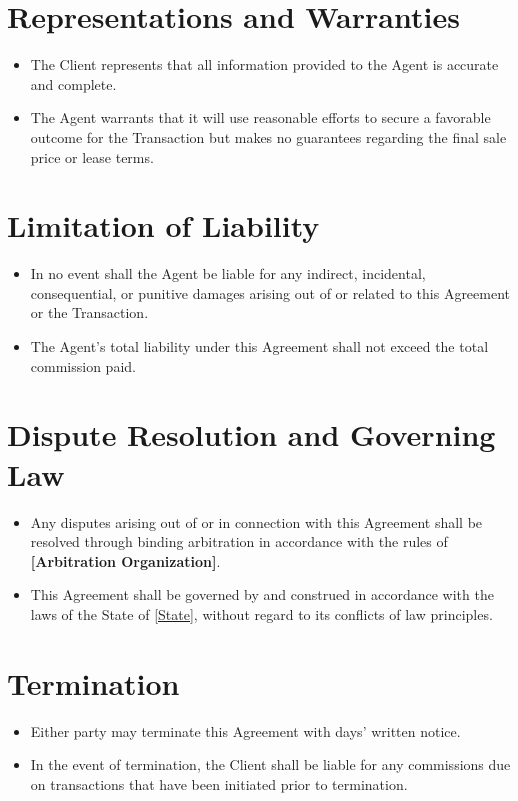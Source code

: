 \documentclass[12pt]{article}
\begin{document}
\section{Representations and Warranties}
\begin{itemize}[leftmargin=1.5cm]
    \item The Client represents that all information provided to the Agent is accurate and complete.
    \item The Agent warrants that it will use reasonable efforts to secure a favorable outcome for the Transaction but makes no guarantees regarding the final sale price or lease terms.
\end{itemize}

\section{Limitation of Liability}
\begin{itemize}[leftmargin=1.5cm]
    \item In no event shall the Agent be liable for any indirect, incidental, consequential, or punitive damages arising out of or related to this Agreement or the Transaction.
    \item The Agent’s total liability under this Agreement shall not exceed the total commission paid.
\end{itemize}

\section{Dispute Resolution and Governing Law}
\begin{itemize}[leftmargin=1.5cm]
    \item Any disputes arising out of or in connection with this Agreement shall be resolved through binding arbitration in accordance with the rules of \textbf{[Arbitration Organization]}.
    \item This Agreement shall be governed by and construed in accordance with the laws of the State of \underline{[State]}, without regard to its conflicts of law principles.
\end{itemize}

\section{Termination}
\begin{itemize}[leftmargin=1.5cm]
    \item Either party may terminate this Agreement with \underline{\hspace{3cm}} days' written notice.
    \item In the event of termination, the Client shall be liable for any commissions due on transactions that have been initiated prior to termination.
\end{itemize}
\end{document}
